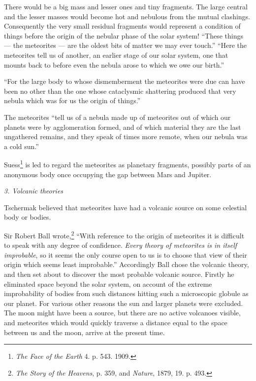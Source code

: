 \documentclass[a4paper, 12pt, oneside, landscape]{article}
\begin{document}
There would be a big mass and lesser ones and tiny fragments. The large central and the lesser masses would become hot and nebulous from the mutual clashings. Consequently the very small residual fragments would represent a condition of things before the origin of the nebular phase of the solar system! ``These things --- the meteorites --- are the oldest bits of matter we may ever touch.'' ``Here the meteorites tell us of another, an earlier stage of our solar system, one that mounts back to before even the nebula arose to which we owe our birth.''

``For the large body to whose dismemberment the meteorites were due can have been no other than the one whose cataclysmic shattering produced that very nebula which was for us the origin of things.''

The meteorites ``tell us of a nebula made up of meteorites out of which our planets were by agglomeration formed, and of which material they are the last ungathered remains, and they speak of times more remote, when our nebula was a cold sun.''

Suess\footnote{\emph{The Face of the Earth} 4. p. 543. 1909.} is led to regard the meteorites as planetary fragments, possibly parts of an anonymous body once occupying the gap between Mars and Jupiter.

\bigskip
\centerline{\emph{3. Volcanic theories}}

Tschermak believed that meteorites have had a volcanic source on some celestial body or bodies.

Sir Robert Ball wrote,\footnote{\emph{The Story of the Heavens}, p. 359, and \emph{Nature}, 1879, 19. p. 493.} ``With reference to the origin of meteorites it is difficult to speak with any degree of confidence. \emph{Every theory of meteorites is in itself improbable}, so it seems the only course open to us is to choose that view of their origin which seems least improbable.'' Accordingly Ball chose the volcanic theory, and then set about to discover the most probable volcanic source. Firstly he eliminated space beyond the solar system, on account of the extreme improbability of bodies from such distances hitting such a microscopic globule as our planet. For various other reasons the sun and larger planets were excluded. The moon might have been a source, but there are no active volcanoes visible, and meteorites which would quickly traverse a distance equal to the space between us and the moon, arrive at the present time.
\end{document}

